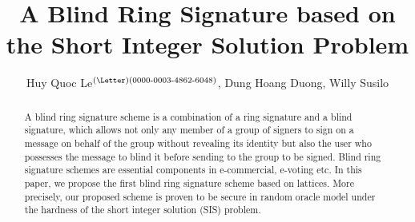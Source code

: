 \documentclass[runningheads]{llncs}
\begin{document}
	\title{\textbf{A Blind Ring Signature based on the Short Integer Solution Problem}}

	\author{Huy Quoc Le$^\textrm{(\Letter)(0000-0003-4862-6048)}$, Dung Hoang Duong, Willy Susilo}
	
	\maketitle

  \begin{abstract}
	A blind ring signature scheme is a combination of a ring signature and a blind signature, which allows not only  any member of a group of signers to sign on a message on behalf of the group without revealing its identity but also the user who possesses the message to blind it before sending to the group to be signed. 
	Blind ring signature schemes are essential components in e-commercial, e-voting etc. 
 In this paper, we propose the first blind ring signature scheme based on lattices. More precisely, our proposed scheme is proven to be secure in random oracle model under the hardness of the short integer solution (\textsf{SIS}) problem.
\end{abstract}
\end{document}
